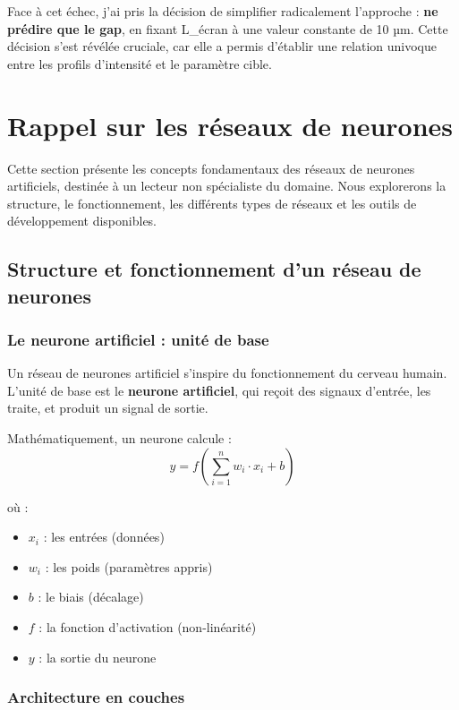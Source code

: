 \documentclass[11pt,a4paper,twocolumn]{article}
\begin{document}
Face à cet échec, j'ai pris la décision de simplifier radicalement l'approche : \textbf{ne prédire que le gap}, en fixant L\_écran à une valeur constante de 10 µm. Cette décision s'est révélée cruciale, car elle a permis d'établir une relation univoque entre les profils d'intensité et le paramètre cible.

\section{Rappel sur les réseaux de neurones}

Cette section présente les concepts fondamentaux des réseaux de neurones artificiels, destinée à un lecteur non spécialiste du domaine. Nous explorerons la structure, le fonctionnement, les différents types de réseaux et les outils de développement disponibles.

\subsection{Structure et fonctionnement d'un réseau de neurones}

\subsubsection{Le neurone artificiel : unité de base}

Un réseau de neurones artificiel s'inspire du fonctionnement du cerveau humain. L'unité de base est le \textbf{neurone artificiel}, qui reçoit des signaux d'entrée, les traite, et produit un signal de sortie.

Mathématiquement, un neurone calcule :
$$y = f\left(\sum_{i=1}^{n} w_i \cdot x_i + b\right)$$

où :
\begin{itemize}
    \item $x_i$ : les entrées (données)
    \item $w_i$ : les poids (paramètres appris)
    \item $b$ : le biais (décalage)
    \item $f$ : la fonction d'activation (non-linéarité)
    \item $y$ : la sortie du neurone
\end{itemize}

\subsubsection{Architecture en couches}
\end{document}
